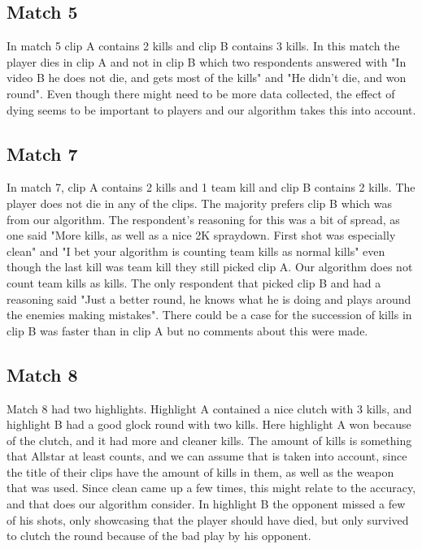 \subsection{Match 5}
In match 5 clip A contains 2 kills and clip B contains 3 kills. In this match the player dies in clip A and not in clip B which two respondents answered with "In video B he does not die, and gets most of the kills" and "He didn't die, and won round". Even though there might need to be more data collected, the effect of dying seems to be important to players and our algorithm takes this into account. 
\subsection{Match 7}
In match 7, clip A contains 2 kills and 1 team kill and clip B contains 2 kills. The player does not die in any of the clips. The majority prefers clip B which was from our algorithm. The respondent's reasoning for this was a bit of spread, as one said "More kills, as well as a nice 2K spraydown. First shot was especially clean" and "I bet your algorithm is counting team kills as normal kills" even though the last kill was team kill they still picked clip A. Our algorithm does not count team kills as kills. The only respondent that picked clip B and had a reasoning said "Just a better round, he knows what he is doing and plays around the enemies making mistakes". There could be a case for the succession of kills in clip B was faster than in clip A but no comments about this were made.
\subsection{Match 8}
Match 8 had two highlights. Highlight A contained a nice clutch with 3 kills, and highlight B had a good glock round with two kills. Here highlight A won because of the clutch, and it had more and cleaner kills. The amount of kills is something that Allstar at least counts, and we can assume that is taken into account, since the title of their clips have the amount of kills in them, as well as the weapon that was used. Since clean came up a few times, this might relate to the accuracy, and that does our algorithm consider. In highlight B the opponent missed a few of his shots, only showcasing that the player should have died, but only survived to clutch the round because of the bad play by his opponent.
